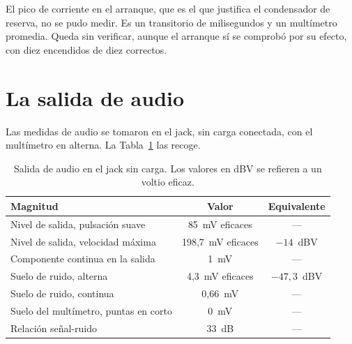 El pico de corriente en el arranque, que es el que justifica el condensador de
reserva, no se pudo medir. Es un transitorio de milisegundos y un multímetro
promedia. Queda sin verificar, aunque el arranque sí se comprobó por su efecto,
con diez encendidos de diez correctos.

\section{La salida de audio}
\label{sec:audio}

Las medidas de audio se tomaron en el jack, sin carga conectada, con el
multímetro en alterna. La Tabla~\ref{tab:audio} las recoge.

\begin{table}[htbp]
    \centering
    \caption{Salida de audio en el jack sin carga. Los valores en dBV se
             refieren a un voltio eficaz.}
    \label{tab:audio}
    \begin{tabular}{lcc}
        \toprule
        \textbf{Magnitud} & \textbf{Valor} & \textbf{Equivalente} \\
        \midrule
        Nivel de salida, pulsación suave      & 85~mV eficaces    & --- \\
        Nivel de salida, velocidad máxima     & 198,7~mV eficaces & $-14$~dBV \\
        Componente continua en la salida      & 1~mV              & --- \\
        Suelo de ruido, alterna               & 4,3~mV eficaces   & $-47,3$~dBV \\
        Suelo de ruido, continua              & 0,66~mV           & --- \\
        Suelo del multímetro, puntas en corto & 0~mV              & --- \\
        Relación señal-ruido                  & 33~dB             & --- \\
        \bottomrule
    \end{tabular}
\end{table}

